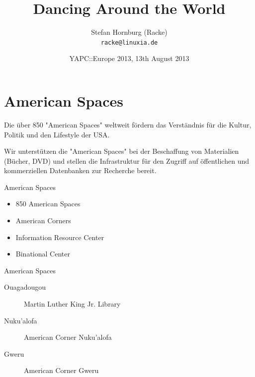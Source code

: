 \usepackage[utf8]{inputenc}
\usepackage[T1]{fontenc}
\usepackage{mathptmx}
\usepackage[scaled=.90]{helvet}
\usepackage{courier}
\usepackage{caption}
\captionsetup{labelformat=empty,labelsep=none}
\usepackage{beamerthemesplit}
\usepackage{verbatim}
\usepackage{hyperref}
\usepackage{listings}
\lstset{language=Perl,basicstyle=\normalsize,tabsize=3,showstringspaces=false}

\title{Dancing Around the World}
\author[racke]{Stefan Hornburg (Racke)\\ \texttt{racke@linuxia.de}}
\date{YAPC::Europe 2013, 13th August 2013}


\maketitle{}

\begin{frame}
  \titlepage
\end{frame}

\tableofcontents

\section{American Spaces}


Die über 850 "American Spaces" weltweit fördern das Verständnis für die Kultur, Politik und den Lifestyle der USA. 

Wir unterstützen die "American Spaces" bei der Beschaffung von Materialien
(Bücher, DVD) und stellen die Infrastruktur für den Zugriff auf öffentlichen
und kommerziellen Datenbanken zur Recherche bereit.

\begin{frame}{American Spaces}
\begin{itemize}
\item 850 American Spaces
\item American Corners
\item Information Resource Center
\item Binational Center

\end{itemize}
\end{frame}

\begin{frame}{American Spaces}
\begin{description}
\item[Ouagadougou] Martin Luther King Jr. Library
\item[Nuku'alofa] American Corner Nuku'alofa

\item[Gweru] American Corner Gweru

\end{description}
\end{frame}

